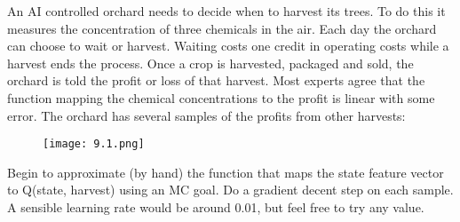 
\begin{exercise}

\phantom{}

An AI controlled orchard needs to decide when to harvest its trees. To do this it measures the concentration
of three chemicals in the air. Each day the orchard can choose to wait or harvest. Waiting costs one credit in
operating costs while a harvest ends the process. Once a crop is harvested, packaged and sold, the orchard is
told the profit or loss of that harvest. Most experts agree that the function mapping the chemical concentrations
to the profit is linear with some error. The orchard has several samples of the profits from other harvests:

\begin{figure}[H]
    \centering
    \texttt{[image: 9.1.png]}
\end{figure}

Begin to approximate (by hand) the function that maps the state feature vector to Q(state, harvest) using an
MC goal. Do a gradient decent step on each sample. A sensible learning rate would be around 0.01, but feel
free to try any value.
\end{exercise}


